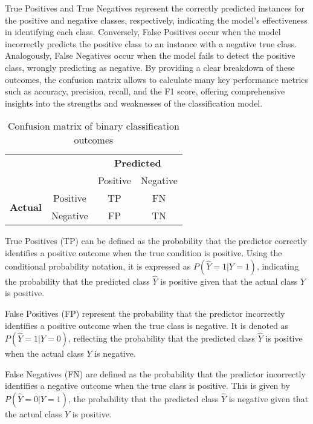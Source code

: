 True Positives and True Negatives represent the correctly predicted instances for the positive and negative classes, respectively, indicating the model's effectiveness in identifying each class. Conversely, False Positives occur when the model incorrectly predicts the positive class to an instance with a negative true class. Analogously, False Negatives occur when the model fails to detect the positive class, wrongly predicting as negative. By providing a clear breakdown of these outcomes, the confusion matrix allows to calculate many key performance metrics such as accuracy, precision, recall, and the F1 score, offering comprehensive insights into the strengths and weaknesses of the classification model.

\begin{table}[h]
    \centering
    \caption{Confusion matrix of binary classification outcomes} \label{tab:confusion_matrix_definition}
    \begin{tabular}{cc|c|c|}
    \cline{3-4}
     & & \multicolumn{2}{c|}{\textbf{Predicted}} \\ \cline{3-4}
     & & Positive & Negative \\ \hline
    \multicolumn{1}{|c|}{\multirow{2}{*}{\textbf{Actual}}} & Positive & TP & FN \\ \cline{2-4}
    \multicolumn{1}{|c|}{} & Negative & FP & TN \\ \hline
    \end{tabular}
\end{table}


True Positives (TP) can be defined as the probability that the predictor correctly identifies a positive outcome when the true condition is positive. Using the conditional probability notation, it is expressed as $P(\hat{Y}=1|Y=1)$, indicating the probability that the predicted class $\hat{Y}$ is positive given that the actual class $Y$ is positive.

False Positives (FP) represent the probability that the predictor incorrectly identifies a positive outcome when the true class is negative. It is denoted as $P(\hat{Y}=1|Y=0)$, reflecting the probability that the predicted class $\hat{Y}$ is positive when the actual class $Y$ is negative.

False Negatives (FN) are defined as the probability that the predictor incorrectly identifies a negative outcome when the true class is positive. This is given by $P(\hat{Y}=0|Y=1)$, the probability that the predicted class $\hat{Y}$ is negative given that the actual class $Y$ is positive.

